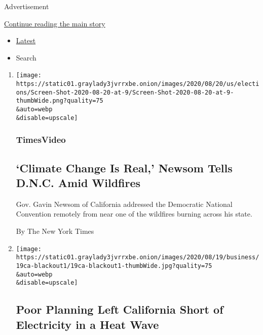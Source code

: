 Advertisement

\protect\hyperlink{after-mid1}{Continue reading the main story}

\begin{itemize}
\tightlist
\item
  \protect\hyperlink{stream-panel}{Latest}
\item
  Search
\end{itemize}

\begin{enumerate}
\def\labelenumi{\arabic{enumi}.}
\item
  \href{/video/us/elections/100000007299993/gavin-newsom-speaks-dnc.html}{}

  \texttt{[image: https://static01.graylady3jvrrxbe.onion/images/2020/08/20/us/elections/Screen-Shot-2020-08-20-at-9/Screen-Shot-2020-08-20-at-9-thumbWide.png?quality=75\\\&auto=webp\\\&disable=upscale]}

  \hypertarget{timesvideo}{%
  \subsubsection{TimesVideo}\label{timesvideo}}

  \hypertarget{climate-change-is-real-newsom-tells-dnc-amid-wildfires}{%
  \subsection{`Climate Change Is Real,' Newsom Tells D.N.C. Amid
  Wildfires}\label{climate-change-is-real-newsom-tells-dnc-amid-wildfires}}

  Gov. Gavin Newsom of California addressed the Democratic National
  Convention remotely from near one of the wildfires burning across his
  state.

  By The New York Times
\item
  \href{/2020/08/20/business/energy-environment/california-blackout-electric-grid.html}{}

  \texttt{[image: https://static01.graylady3jvrrxbe.onion/images/2020/08/19/business/19ca-blackout1/19ca-blackout1-thumbWide.jpg?quality=75\\\&auto=webp\\\&disable=upscale]}

  \hypertarget{poor-planning-left-california-short-of-electricity-in-a-heat-wave}{%
  \subsection{Poor Planning Left California Short of Electricity in a
  Heat
  Wave}\label{poor-planning-left-california-short-of-electricity-in-a-heat-wave}}


\end{enumerate}

